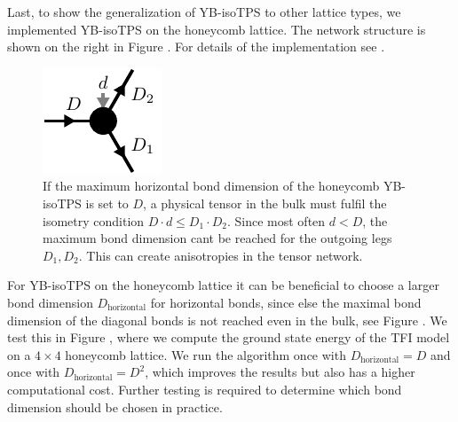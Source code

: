 Last, to show the generalization of YB-isoTPS to other lattice types, we implemented YB-isoTPS on the honeycomb lattice. The network structure is shown on the right in Figure . For details of the implementation see \cite{cite:github_YB_isoTPS}. 

\begin{figure}
	\centering
	\includegraphics[scale=1]{figures/tikz/TFI/hexagonal_lattice/hexagonal_lattice_horizontal_bond_problem.pdf}
	\caption{If the maximum horizontal bond dimension of the honeycomb YB-isoTPS is set to $D$, a physical tensor in the bulk must fulfil the isometry condition $D\cdot d \le D_1\cdot D_2$. Since most often $d < D$, the maximum bond dimension cant be reached for the outgoing legs $D_1, D_2$. This can create anisotropies in the tensor network.}
	\label{fig:honeycomb_horizontal_bond_problem}
\end{figure}
For YB-isoTPS on the honeycomb lattice it can be beneficial to choose a larger bond dimension $D_\text{horizontal}$ for horizontal bonds, since else the maximal bond dimension of the diagonal bonds is not reached even in the bulk, see Figure . We test this in Figure , where we compute the ground state energy of the TFI model on a $4\times4$ honeycomb lattice. We run the algorithm once with $D_\text{horizontal} = D$ and once with $D_\text{horizontal} = D^2$, which improves the results but also has a higher computational cost. Further testing is required to determine which bond dimension should be chosen in practice.